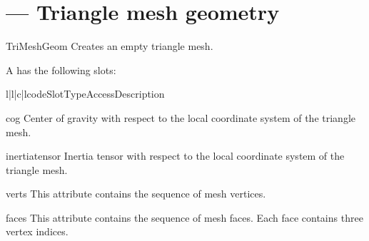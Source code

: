 
\section{ ---
         Triangle mesh geometry}

\begin{classdesc}{TriMeshGeom}{}
Creates an empty triangle mesh.
\end{classdesc}

A  has the following slots:

\begin{tableiv}{l|l|c|l}{code}{Slot}{Type}{Access}{Description}
\end{tableiv}

\begin{memberdesc}{cog}
Center of gravity with respect to the local coordinate system of the 
triangle mesh.
\end{memberdesc}

\begin{memberdesc}{inertiatensor}
Inertia tensor with respect to the local coordinate system of the 
triangle mesh.
\end{memberdesc}

\begin{memberdesc}{verts}
This attribute contains the sequence of mesh vertices.
\end{memberdesc}

\begin{memberdesc}{faces}
This attribute contains the sequence of mesh faces. Each face contains
three vertex indices.
\end{memberdesc}

